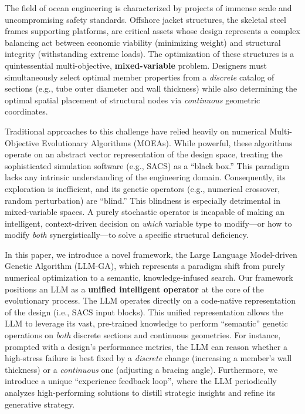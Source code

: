 \documentclass[preprint,12pt]{elsarticle}
\begin{document}
The field of ocean engineering is characterized by projects of immense scale and uncompromising safety standards. Offshore jacket structures, the skeletal steel frames supporting platforms, are critical assets whose design represents a complex balancing act between economic viability (minimizing weight) and structural integrity (withstanding extreme loads). The optimization of these structures is a quintessential multi-objective, \textbf{mixed-variable} problem. Designers must simultaneously select optimal member properties from a \textit{discrete} catalog of sections (e.g., tube outer diameter and wall thickness) while also determining the optimal spatial placement of structural nodes via \textit{continuous} geometric coordinates.

Traditional approaches to this challenge have relied heavily on numerical Multi-Objective Evolutionary Algorithms (MOEAs). While powerful, these algorithms operate on an abstract vector representation of the design space, treating the sophisticated simulation software (e.g., SACS) as a ``black box.'' This paradigm lacks any intrinsic understanding of the engineering domain. Consequently, its exploration is inefficient, and its genetic operators (e.g., numerical crossover, random perturbation) are ``blind.'' This blindness is especially detrimental in mixed-variable spaces. A purely stochastic operator is incapable of making an intelligent, context-driven decision on \textit{which} variable type to modify—or how to modify \textit{both} synergistically—to solve a specific structural deficiency.

In this paper, we introduce a novel framework, the Large Language Model-driven Genetic Algorithm (LLM-GA), which represents a paradigm shift from purely numerical optimization to a semantic, knowledge-infused search. Our framework positions an LLM as a \textbf{unified intelligent operator} at the core of the evolutionary process. The LLM operates directly on a code-native representation of the design (i.e., SACS input blocks). This unified representation allows the LLM to leverage its vast, pre-trained knowledge to perform ``semantic'' genetic operations on \textit{both} discrete sections and continuous geometries. For instance, prompted with a design's performance metrics, the LLM can reason whether a high-stress failure is best fixed by a \textit{discrete} change (increasing a member's wall thickness) or a \textit{continuous} one (adjusting a bracing angle). Furthermore, we introduce a unique ``experience feedback loop'', where the LLM periodically analyzes high-performing solutions to distill strategic insights and refine its generative strategy.
\end{document}
